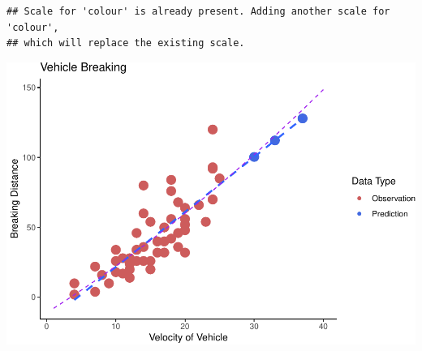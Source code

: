 \documentclass[]{article}
\begin{document}
\begin{verbatim}
## Scale for 'colour' is already present. Adding another scale for 'colour',
## which will replace the existing scale.
\end{verbatim}

\includegraphics{./figure/unnamed-chunk-20-1.pdf}
\end{document}
